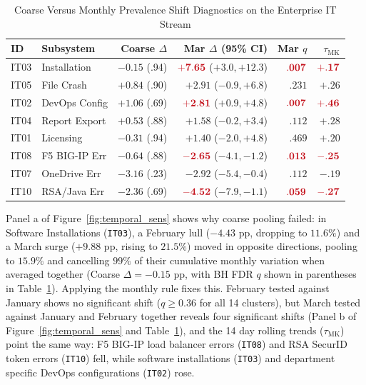 \documentclass[sigconf,nonacm,pbalance]{acmart}
\newcommand{\hl}[1]{\textcolor{hlred}{\mathbf{#1}}}
\begin{document}
\begin{table}[!htbp]
  \caption{Coarse Versus Monthly Prevalence Shift Diagnostics on the Enterprise IT Stream}
  \label{tab:exp8}
  \footnotesize
  \setlength{\tabcolsep}{2.4pt}
  \begin{tabular}{llrrrr}
    \toprule
    ID & Subsystem & Coarse $\Delta$ & Mar $\Delta$ (95\% CI) & Mar $q$ & $\tau_{\text{MK}}$ \\
    \midrule
    IT03 & Installation & $-0.15$ (.94) & $\hl{+7.65}$ ($+3.0, +12.3$) & $\hl{.007}$ & $\hl{+.17}$ \\
    IT05 & File Crash & $+0.84$ (.90) & $+2.91$ ($-0.9, +6.8$) & $.231$ & $+.26$ \\
    IT02 & DevOps Config & $+1.06$ (.69) & $\hl{+2.81}$ ($+0.9, +4.8$) & $\hl{.007}$ & $\hl{+.46}$ \\
    IT04 & Report Export & $+0.53$ (.88) & $+1.58$ ($-0.2, +3.4$) & $.112$ & $+.28$ \\
    IT01 & Licensing & $-0.31$ (.94) & $+1.40$ ($-2.0, +4.8$) & $.469$ & $+.20$ \\
    IT08 & F5 BIG-IP Err & $-0.64$ (.88) & $\hl{-2.65}$ ($-4.1, -1.2$) & $\hl{.013}$ & $\hl{-.25}$ \\
    IT07 & OneDrive Err & $-3.16$ (.23) & $-2.92$ ($-5.4, -0.4$) & $.112$ & $-.19$ \\
    IT10 & RSA/Java Err & $-2.36$ (.69) & $\hl{-4.52}$ ($-7.9, -1.1$) & $\hl{.059}$ & $\hl{-.27}$ \\
    \bottomrule
  \end{tabular}
\end{table}

Panel a of Figure~\ref{fig:temporal_sens} shows why coarse pooling failed: in Software Installations (\texttt{IT03}), a February lull ($-4.43$ pp, dropping to $11.6\%$) and a March surge ($+9.88$ pp, rising to $21.5\%$) moved in opposite directions, pooling to $15.9\%$ and cancelling $99\%$ of their cumulative monthly variation when averaged together (Coarse $\Delta = -0.15$ pp, with BH FDR $q$ shown in parentheses in Table~\ref{tab:exp8}). Applying the monthly rule fixes this. February tested against January shows no significant shift ($q \ge 0.36$ for all 14 clusters), but March tested against January and February together reveals four significant shifts (Panel b of Figure~\ref{fig:temporal_sens} and Table~\ref{tab:exp8}), and the 14 day rolling trends ($\tau_{\text{MK}}$) point the same way: F5 BIG-IP load balancer errors (\texttt{IT08}) and RSA SecurID token errors (\texttt{IT10}) fell, while software installations (\texttt{IT03}) and department specific DevOps configurations (\texttt{IT02}) rose.
\end{document}
